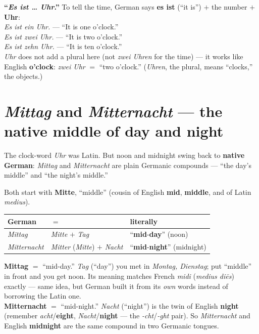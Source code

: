 \begin{grammarlens}
\textbf{``\emph{Es ist \ldots{} Uhr}.''} To tell the time, German says
\textbf{es ist} (``it is'') $+$ the number $+$ \textbf{Uhr}:\\[3pt]
\emph{Es ist ein Uhr.} --- ``It is one o'clock.''\\[3pt]
\emph{Es ist zwei Uhr.} --- ``It is two o'clock.''\\[3pt]
\emph{Es ist zehn Uhr.} --- ``It is ten o'clock.''\\[3pt]
\emph{Uhr} does not add a plural here (not \emph{zwei Uhren} for the time) ---
it works like English \textbf{o'clock}: \emph{zwei Uhr} $=$ ``two o'clock.''
(\emph{Uhren}, the plural, means ``clocks,'' the objects.)
\end{grammarlens}

\section[\emph{Mittag} and \emph{Mitternacht}]{\emph{Mittag} and \emph{Mitternacht} --- the native middle of day and night}
\label{lesson:mittag-mitternacht}

The clock-word \emph{Uhr} was Latin. But noon and midnight swing back to
\textbf{native German}: \emph{Mittag} and \emph{Mitternacht} are plain Germanic
compounds --- ``the day's middle'' and ``the night's middle.''

\begin{morphologybox}
Both start with \textbf{Mitte}, ``middle'' (cousin of English \textbf{mid},
\textbf{middle}, and of Latin \emph{medius}).
\end{morphologybox}

\begin{center}
\begin{tabular}{@{}lll@{}}
\toprule
German & $=$ & literally \\
\midrule
\emph{Mittag} & \emph{Mitte} $+$ \emph{Tag} & ``\textbf{mid}-\textbf{day}'' (noon) \\
\emph{Mitternacht} & \emph{Mitter} (\emph{Mitte}) $+$ \emph{Nacht} & ``\textbf{mid}-\textbf{night}'' (midnight) \\
\bottomrule
\end{tabular}
\end{center}

\begin{cousinweb}
\textbf{Mittag} $=$ ``mid-day.'' \emph{Tag} (``day'') you met in \emph{Montag,
Dienstag}; put ``middle'' in front and you get noon. Its meaning matches French
\emph{midi} (\emph{medius di\={e}s}) exactly --- same idea, but German built it
from its \emph{own} words instead of borrowing the Latin one.\\[3pt]
\textbf{Mitternacht} $=$ ``mid-night.'' \emph{Nacht} (``night'') is the twin of
English \textbf{night} (remember \emph{acht}/\textbf{eight},
\emph{Nacht}/\textbf{night} --- the \emph{-cht}/\emph{-ght} pair). So
\emph{Mitternacht} and English \textbf{midnight} are the same compound in two
Germanic tongues.
\end{cousinweb}

